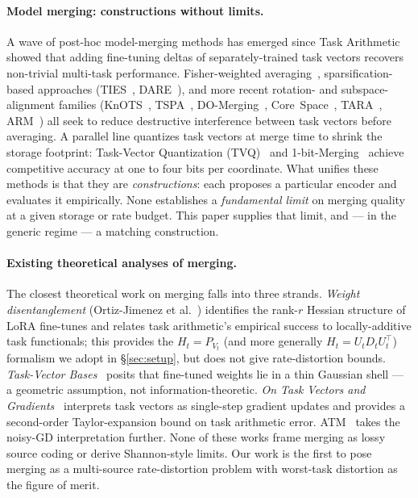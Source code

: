 \paragraph{Model merging: constructions without limits.}
A wave of post-hoc model-merging methods has emerged since Task
Arithmetic~\cite{ilharco2023task} showed that adding fine-tuning
deltas of separately-trained task vectors recovers non-trivial
multi-task performance. Fisher-weighted averaging~\cite{matena2022fisher},
sparsification-based approaches (TIES~\cite{yadav2023ties},
DARE~\cite{yu2024dare}), and more recent rotation- and
subspace-alignment families (KnOTS~\cite{stoica2025knots},
TSPA~\cite{tspa2025}, DO-Merging~\cite{domerging2025},
Core~Space~\cite{panariello2025core}, TARA~\cite{tara2025},
ARM~\cite{arm2026streaming}) all seek to reduce destructive
interference between task vectors before averaging. A parallel
line quantizes task vectors at merge time to shrink the storage
footprint: Task-Vector Quantization (TVQ)~\cite{kim2025tvq} and
1-bit-Merging~\cite{bit1merging2025} achieve competitive accuracy
at one to four bits per coordinate. What unifies these methods is
that they are \emph{constructions}: each proposes a particular
encoder and evaluates it empirically. None establishes a
\emph{fundamental limit} on merging quality at a given storage or
rate budget. This paper supplies that limit, and — in the generic
regime — a matching construction.

\paragraph{Existing theoretical analyses of merging.}
The closest theoretical work on merging falls into three strands.
\emph{Weight disentanglement} (Ortiz-Jimenez et
al.~\cite{ortizjimenez2023disentanglement}) identifies the
rank-$r$ Hessian structure of LoRA fine-tunes and relates task
arithmetic's empirical success to locally-additive task
functionals; this provides the $H_t = P_{V_t}$ (and more
generally $H_t = U_t D_t U_t^\top$) formalism we adopt in
\S\ref{sec:setup}, but does not give rate-distortion bounds.
\emph{Task-Vector Bases}~\cite{jang2025taskvectorbases} posits
that fine-tuned weights lie in a thin Gaussian shell — a
geometric assumption, not information-theoretic. \emph{On Task
Vectors and Gradients}~\cite{gradients2025taskvectorsgradients}
interprets task vectors as single-step gradient updates and
provides a second-order Taylor-expansion bound on task
arithmetic error. ATM~\cite{atm2024alternating} takes the
noisy-GD interpretation further. None of these works frame
merging as lossy source coding or derive Shannon-style limits.
Our work is the first to pose merging as a multi-source
rate-distortion problem with worst-task distortion as the figure
of merit.

